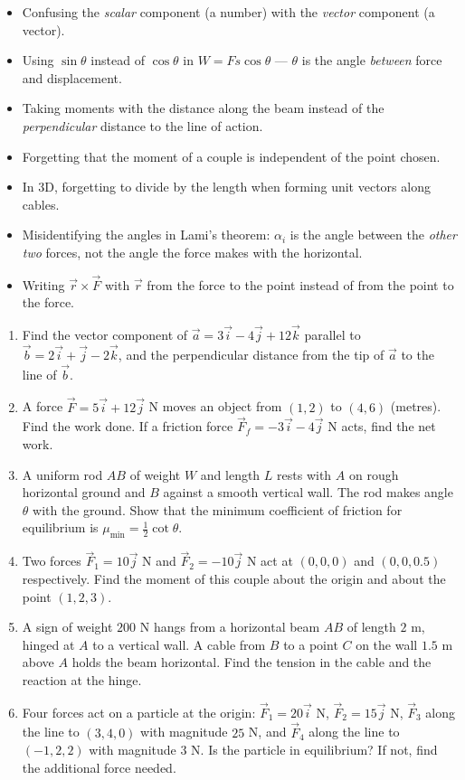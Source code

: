 \documentclass[11pt]{article}
\begin{document}
\begin{attention}
\begin{itemize}
\item Confusing the \emph{scalar} component (a number) with the \emph{vector} component (a vector).
\item Using $\sin\theta$ instead of $\cos\theta$ in $W = Fs\cos\theta$ — $\theta$ is the angle \emph{between} force and displacement.
\item Taking moments with the distance along the beam instead of the \emph{perpendicular} distance to the line of action.
\item Forgetting that the moment of a couple is independent of the point chosen.
\item In 3D, forgetting to divide by the length when forming unit vectors along cables.
\item Misidentifying the angles in Lami's theorem: $\alpha_i$ is the angle between the \emph{other two} forces, not the angle the force makes with the horizontal.
\item Writing $\vec{r}\times\vec{F}$ with $\vec{r}$ from the force to the point instead of from the point to the force.
\end{itemize}
\end{attention}

\begin{exercice}
\begin{enumerate}
\item Find the vector component of $\vec{a}=3\vec{i}-4\vec{j}+12\vec{k}$ parallel to $\vec{b}=2\vec{i}+\vec{j}-2\vec{k}$, and the perpendicular distance from the tip of $\vec{a}$ to the line of $\vec{b}$.
\item A force $\vec{F}=5\vec{i}+12\vec{j}$ N moves an object from $(1,2)$ to $(4,6)$ (metres). Find the work done. If a friction force $\vec{F}_f=-3\vec{i}-4\vec{j}$ N acts, find the net work.
\item A uniform rod $AB$ of weight $W$ and length $L$ rests with $A$ on rough horizontal ground and $B$ against a smooth vertical wall. The rod makes angle $\theta$ with the ground. Show that the minimum coefficient of friction for equilibrium is $\mu_{\min}=\frac{1}{2}\cot\theta$.
\item Two forces $\vec{F}_1=10\vec{j}$ N and $\vec{F}_2=-10\vec{j}$ N act at $(0,0,0)$ and $(0,0,0.5)$ respectively. Find the moment of this couple about the origin and about the point $(1,2,3)$.
\item A sign of weight $200$ N hangs from a horizontal beam $AB$ of length $2$ m, hinged at $A$ to a vertical wall. A cable from $B$ to a point $C$ on the wall $1.5$ m above $A$ holds the beam horizontal. Find the tension in the cable and the reaction at the hinge.
\item Four forces act on a particle at the origin: $\vec{F}_1=20\vec{i}$ N, $\vec{F}_2=15\vec{j}$ N, $\vec{F}_3$ along the line to $(3,4,0)$ with magnitude $25$ N, and $\vec{F}_4$ along the line to $(-1,2,2)$ with magnitude $3$ N. Is the particle in equilibrium? If not, find the additional force needed.
\end{enumerate}
\end{exercice}
\end{document}
